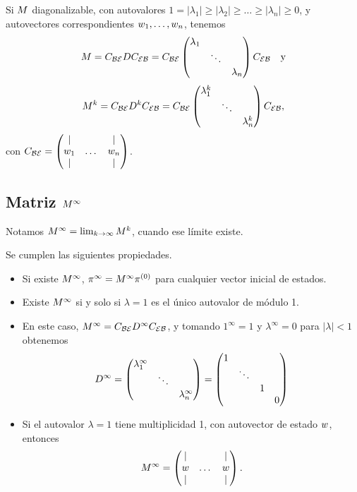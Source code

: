 Si $\Mb$ diagonalizable, con autovalores $1 = |\lambda_1| \ge |\lambda_2| \ge \dots \ge |\lambda_n| \ge 0$, y autovectores correspondientes $\wb_1, \dots, \wb_n$, tenemos
$$
\Mb = \Cb_{\B\E} \Db \Cb_{\E\B} = \Cb_{\B\E} \begin{pmatrix} \lambda_1 & & \\ & \ddots & \\ & & \lambda_n \end{pmatrix} \Cb_{\E\B} \quad \text{y}
$$
$$
\Mb^k = \Cb_{\B\E} \Db^{k} \Cb_{\E\B} = \Cb_{\B\E} \begin{pmatrix} \lambda_1^k & & \\ & \ddots & \\ & & \lambda_n^k \end{pmatrix} \Cb_{\E\B},
$$
con $\Cb_{\B\E} = \begin{pmatrix} \vert & & \vert \\ \wb_1 & \dots & \wb_n \\ \vert & & \vert \end{pmatrix}$.

\subsection{Matriz $\Mb^{\infty}$}

Notamos $\Mb^{\infty} = \lim_{k \rightarrow \infty} \Mb^k$, cuando ese límite existe.

\begin{prop} Se cumplen las siguientes propiedades.
\begin{itemize}
\item Si existe $\Mb^{\infty}$, $\pib^{\infty} = \Mb^{\infty} \pib^{(0)}$ para cualquier vector inicial de estados.
\item Existe $\Mb^{\infty}$ si y solo si $\lambda = 1$ es el único autovalor de módulo 1.
\item En este caso,
$\Mb^\infty = \Cb_{\B\E} \Db^\infty \Cb_{\E\B}$, y tomando $1^\infty = 1$ y $\lambda^\infty = 0$ para $|\lambda| < 1$ obtenemos
$$\Db^\infty = \begin{pmatrix} \lambda_1^\infty & & \\ & \ddots & \\ & & \lambda_n^\infty \end{pmatrix} =
{\begin{pmatrix} \begin{matrix} 1 & & \\ & \ddots & \\ & & 1\end{matrix} &  \\  & 0\end{pmatrix}}$$
\item Si el autovalor $\lambda = 1$ tiene multiplicidad 1, con autovector de estado $\wb$, entonces
$$
\Mb^{\infty} = \begin{pmatrix} \vert & & \vert \\ \wb & \dots & \wb \\ \vert & & \vert \end{pmatrix}.
$$
\end{itemize}
\end{prop}

